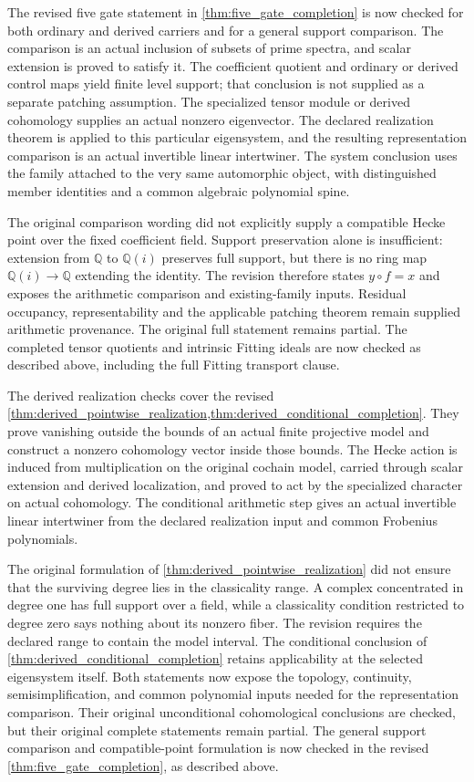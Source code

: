 \documentclass[11pt]{amsart}
\theoremstyle{definition}
\theoremstyle{remark}
\begin{document}
The revised five gate statement in \cref{thm:five_gate_completion} is now checked for both ordinary and derived carriers and for a general support comparison. The comparison is an actual inclusion of subsets of prime spectra, and scalar extension is proved to satisfy it. The coefficient quotient and ordinary or derived control maps yield finite level support; that conclusion is not supplied as a separate patching assumption. The specialized tensor module or derived cohomology supplies an actual nonzero eigenvector. The declared realization theorem is applied to this particular eigensystem, and the resulting representation comparison is an actual invertible linear intertwiner. The system conclusion uses the family attached to the very same automorphic object, with distinguished member identities and a common algebraic polynomial spine.

The original comparison wording did not explicitly supply a compatible Hecke point over the fixed coefficient field. Support preservation alone is insufficient: extension from \(\mathbb Q\) to \(\mathbb Q(i)\) preserves full support, but there is no ring map \(\mathbb Q(i)\to\mathbb Q\) extending the identity. The revision therefore states \(y\circ f=x\) and exposes the arithmetic comparison and existing-family inputs. Residual occupancy, representability and the applicable patching theorem remain supplied arithmetic provenance. The original full statement remains partial. The completed tensor quotients and intrinsic Fitting ideals are now checked as described above, including the full Fitting transport clause.

The derived realization checks cover the revised \cref{thm:derived_pointwise_realization,thm:derived_conditional_completion}. They prove vanishing outside the bounds of an actual finite projective model and construct a nonzero cohomology vector inside those bounds. The Hecke action is induced from multiplication on the original cochain model, carried through scalar extension and derived localization, and proved to act by the specialized character on actual cohomology. The conditional arithmetic step gives an actual invertible linear intertwiner from the declared realization input and common Frobenius polynomials.

The original formulation of \cref{thm:derived_pointwise_realization} did not ensure that the surviving degree lies in the classicality range. A complex concentrated in degree one has full support over a field, while a classicality condition restricted to degree zero says nothing about its nonzero fiber. The revision requires the declared range to contain the model interval. The conditional conclusion of \cref{thm:derived_conditional_completion} retains applicability at the selected eigensystem itself. Both statements now expose the topology, continuity, semisimplification, and common polynomial inputs needed for the representation comparison. Their original unconditional cohomological conclusions are checked, but their original complete statements remain partial. The general support comparison and compatible-point formulation is now checked in the revised \cref{thm:five_gate_completion}, as described above.
\end{document}
